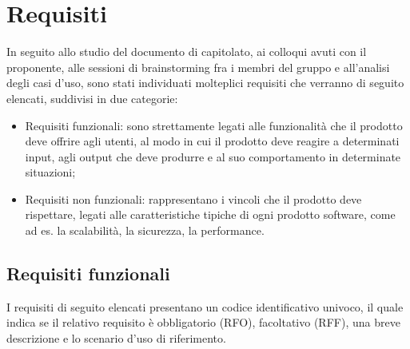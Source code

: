 \section{Requisiti}

In seguito allo studio del documento di capitolato, ai colloqui avuti con il proponente, alle sessioni di
brainstorming fra i membri del gruppo e all'analisi degli casi d'uso, sono stati individuati molteplici requisiti
che verranno di seguito elencati, suddivisi in due categorie:

\begin{itemize}
    \item Requisiti funzionali: sono strettamente legati alle funzionalità che il prodotto deve offrire agli utenti,
    al modo in cui il prodotto deve reagire a determinati input, agli output che deve produrre e al suo comportamento in determinate situazioni;
    \item Requisiti non funzionali: rappresentano i vincoli che il prodotto deve rispettare, legati alle caratteristiche tipiche di
    ogni prodotto software, come ad es. la scalabilità, la sicurezza, la performance.
\end{itemize}

\subsection{Requisiti funzionali}

I requisiti di seguito elencati presentano un codice identificativo univoco, il quale indica se il relativo requisito è
obbligatorio (RFO), facoltativo (RFF), una breve descrizione e lo scenario d'uso di riferimento.

